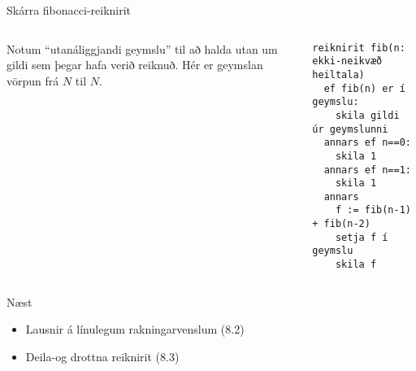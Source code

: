 \documentclass[handout]{beamer}
\begin{document}
\begin{frame}[fragile]{Skárra fibonacci-reiknirit}
\begin{columns}
Notum ``utanáliggjandi geymslu'' til að halda utan um gildi sem þegar hafa verið reiknuð. Hér er geymslan vörpun frá $N$ til $N$.
\begin{verbatim}
reiknirit fib(n: ekki-neikvæð heiltala)
  ef fib(n) er í geymslu:
    skila gildi úr geymslunni
  annars ef n==0:
    skila 1
  annars ef n==1:
    skila 1
  annars
    f := fib(n-1) + fib(n-2)
    setja f í geymslu
    skila f
\end{verbatim}
\end{columns}
\end{frame}

\begin{frame}{Næst}
\begin{itemize}
 \item Lausnir á línulegum rakningarvenslum (8.2)
 \item Deila-og drottna reiknirit (8.3)
\end{itemize}

\end{frame}
\end{document}
